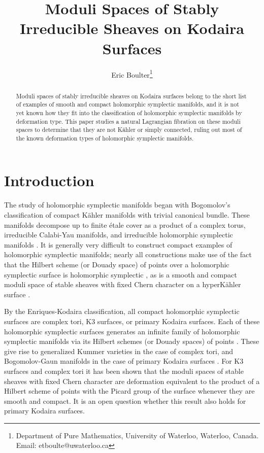 \documentclass{article}[12pt]
\title{Moduli Spaces of Stably Irreducible Sheaves on Kodaira Surfaces}
\author{Eric Boulter\footnote{Department of Pure Mathematics, University of Waterloo, Waterloo, Canada.  Email: etboulte@uwaterloo.ca}}
\theoremstyle{definition}
\theoremstyle{remark}
\numberwithin{equation}{section}
\begin{document}
	
\maketitle

\begin{abstract}
 Moduli spaces of stably irreducible sheaves on Kodaira surfaces belong to the short list of examples of smooth and compact holomorphic symplectic manifolds, and it is not yet known how they fit into the classification of holomorphic symplectic manifolds by deformation type. This paper studies a natural Lagrangian fibration on these moduli spaces to determine that they are not K\"ahler or simply connected, ruling out most of the known deformation types of holomorphic symplectic manifolds.
\end{abstract}

\tableofcontents

\section{Introduction}
The study of holomorphic symplectic manifolds began with Bogomolov's classification of compact K\"ahler manifolds with trivial canonical bundle. These manifolds decompose up to finite \'etale cover as a product of a complex torus, irreducible Calabi-Yau manifolds, and irreducible holomorphic symplectic manifolds \cite{BeauSurvey,Bog}. It is generally very difficult to construct compact examples of holomorphic symplectic manifolds; nearly all constructions make use of the fact that the Hilbert scheme (or Douady space) of points over a holomorphic symplectic surface is holomorphic symplectic \cite{Beau}, as is a smooth and compact moduli space of stable sheaves with fixed Chern character on a hyperK\"ahler surface \cite{Mukai}.

By the Enriques-Kodaira classification, all compact holomorphic symplectic surfaces are complex tori, K3 surfaces, or primary Kodaira surfaces. Each of these holomorphic symplectic surfaces generates an infinite family of holomorphic symplectic manifolds via its Hilbert schemes (or Douady spaces) of points \cite{Beau}. These give rise to generalized Kummer varieties in the case of complex tori, and Bogomolov-Gaun manifolds in the case of primary Kodaira surfaces \cite{BogGuan,Guan}. For K3 surfaces and complex tori it has been shown that the moduli spaces of stable sheaves with fixed Chern character are deformation equivalent to the product of a Hilbert scheme of points with the Picard group of the surface \cite{O'GradyHodgeSt,Yoshioka} whenever they are smooth and compact. It is an open question whether this result also holds for primary Kodaira surfaces.
\end{document}
